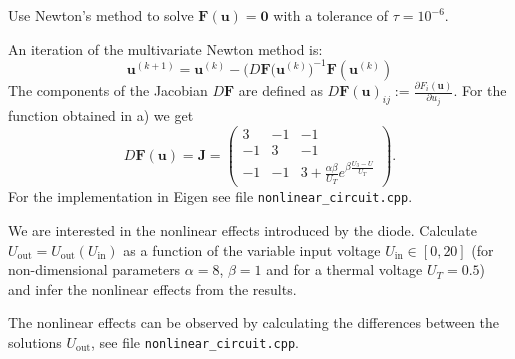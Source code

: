 \begin{problem}
\begin{subproblem}[3]
    Use Newton's method to solve $\mathbf{F}(\mathbf{u})=\mathbf{0}$ with
    a tolerance of $\tau=10^{-6}$.
      \begin{solution}
      An iteration of the multivariate Newton method is:
    $$ \mathbf{u}^{(k+1)} = \mathbf{u}^{(k)} - \big(D\mathbf{F}(\mathbf{u}^{(k)}\big)^{-1}\mathbf{F}(\mathbf{u}^{(k)}) $$
    The components of the Jacobian $D\mathbf{F}$ are defined as $D\mathbf{F}(\mathbf{u})_{ij}:=\frac{\partial F_i(\mathbf{u})}{\partial u_j}$. 
    For the function obtained in a) we get
    $$ D\mathbf{F}(\mathbf{u})=\mathbf{J}=\left(\begin{array}{rrl}3 & -1 & -1 \\ -1 & 3 & -1 \\ -1 & -1 & 3+ \frac{\alpha\beta}{U_T}e^{\beta\frac{U_3-U}{U_T}} \end{array}\right).$$
     For the implementation in Eigen see file \texttt{nonlinear\_circuit.cpp}.
            \end{solution}
  \end{subproblem}
      \begin{subproblem}[2]
      We are interested in the nonlinear effects introduced by the diode. Calculate
      $U_{\text{out}}=U_{\text{out}}(U_{\text{in}})$ as a function of the variable
      input voltage $U_{\text{in}}\in[0,20]$ (for non-dimensional parameters
      $\alpha=8$, $\beta=1$ and for a thermal voltage $U_T=0.5$) and infer the nonlinear effects from the results.
       \begin{solution}
 The nonlinear effects can be observed by calculating the differences between the solutions $U_{\text{out}}$, see file \texttt{nonlinear\_circuit.cpp}.
       \end{solution}
    \end{subproblem}
  \end{problem}